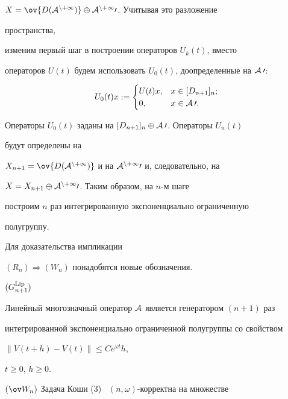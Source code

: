 \begin{pf}
$X=\ov{D(\cal A^{n+1})}\oplus\cal A^{n+1}0$. Учитывая это разложение 


пространства, 


изменим первый шаг в построении операторов $U_k(t)$, вместо 


операторов $U(t)$ будем использовать $U_0(t)$, доопределенные на $\cal A0$: 


$$ 


U_0(t)x:= 


\begin{cases} 


U(t)x, & x\in [D_{n+1}]_n;\\ 


0, & x\in\cal A0. 


\end{cases} 


$$ 


Операторы $U_0(t)$ заданы на $[D_{n+1}]_n\oplus\cal A0$. Операторы $U_n(t)$ 


будут определены на 


$X_{n+1}=\ov{D(\cal A^{n+1})}$ и на $\cal A^{n+1}0$ и, следовательно, на 


$X=X_{n+1}\oplus\cal A^{n+1}0$. Таким образом, на $n$-м шаге 


построим $n$ раз интегрированную экспоненциально ограниченную 


полугруппу.


\end{pf}


 


Для доказательства импликации 


$(R_n)\Longrightarrow(W_n)$ понадобятся новые обозначения. 


\medskip





\noindent{}$(G^{\operatorname{Lip}}_{n+1})$


Линейный многозначный оператор $\cal A$ является генератором $(n+1)$ раз 


интегрированной экспоненциально ограниченной полугруппы со свойством 


$\|V(t+h)-V(t)\|\le C e^{\omega t}h$, 


$t\ge0$, $h\ge0$.


\vspace*{1mm}





\noindent{}$(\ov W_n)$ Задача Коши (3) \ $(n,\omega)$-корректна на множестве 


